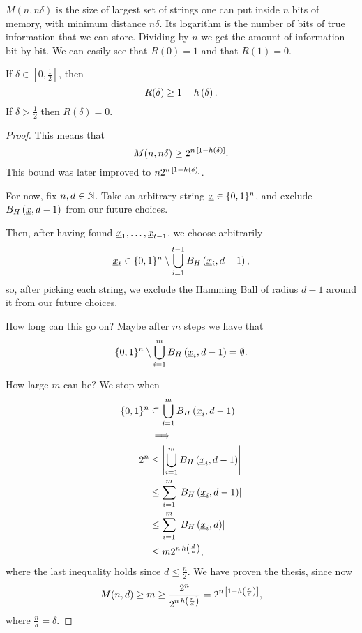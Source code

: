 $M(n, n \delta)$ is the size of largest set of strings one can put inside $n$ bits of memory, with minimum distance $n \delta$.
Its logarithm is the number of bits of true information that we can store.
Dividing by $n$ we get the amount of information bit by bit.
We can easily see that $R(0) = 1$ and that $R(1) = 0$.

\begin{thm} \label{thm:gilbert-varshamov}
	If $\delta \in \left[ 0, \frac{1}{2} \right]$, then
	\begin{equation*}
		R(\delta) \ge 1 - h\left({\delta}\right).
	\end{equation*}
	If $\delta > \frac{1}{2}$ then $R(\delta) = 0$.
\end{thm}

\begin{proof}
	This means that
	\begin{equation*}
		M(n, n \delta) \ge 2^{n \, \left[1 - h\left({\delta}\right) \right]}.
	\end{equation*}
	This bound was later improved to $n 2^{n \, \left[1 - h\left({\delta}\right) \right]}$.

	For now, fix $n, d \in \mathbb{N}$.
	Take an arbitrary string $\underline{x} \in \{0, 1\}^n$, and exclude $B_H\left(\underline{x}, d-1\right)$ from our future choices.

	Then, after having found $\underline{x}_1, \dots, \underline{x}_{t-1}$, we choose arbitrarily
	\begin{equation*}
		\underline{x}_t \in \{0, 1\}^n \setminus \bigcup_{i = 1}^{t-1} B_H\left(\underline{x}_i, d-1\right),
	\end{equation*}
	so, after picking each string, we exclude the Hamming Ball of radius $d-1$ around it from our future choices.

	How long can this go on?
	Maybe after $m$ steps we have that
	\begin{equation*}
		\{0, 1\}^n \setminus \bigcup_{i = 1}^{m} B_H\left(\underline{x}_i, d-1\right) = \emptyset.
	\end{equation*}

	How large $m$ can be?
	We stop when 
	\begin{align*}
		\{0, 1\}^n
		& \subseteq
		\bigcup_{i = 1}^{m} B_H\left(\underline{x}_i, d-1\right)
		\\
		& \implies
		\\
		2^n
		& \le
		\left|{\bigcup_{i = 1}^{m} B_H\left(\underline{x}_i, d-1\right)}\right|
		\\
		& \le
		\sum_{i = 1}^m \left|{B_H\left(\underline{x}_i, d-1\right)}\right|
		\\
		& \le
		\sum_{i = 1}^m \left|{B_H\left(\underline{x}_i, d\right)}\right|
		\\
		& \le
		m 2^{n \, h\left({\frac{d}{n}}\right)},
	\end{align*}
	where the last inequality holds since $d \le \frac{n}{2}$.
	We have proven the thesis, since now
	\begin{equation*}
		M(n, d) \ge m \ge \frac{2^n}{2^{n \, h\left({\frac{n}{d}}\right)}}
		=
		2^{n \, \left[ 1 - h\left({\frac{n}{d}}\right) \right]},
	\end{equation*}
	where $\frac{n}{d} = \delta.$
\end{proof}

